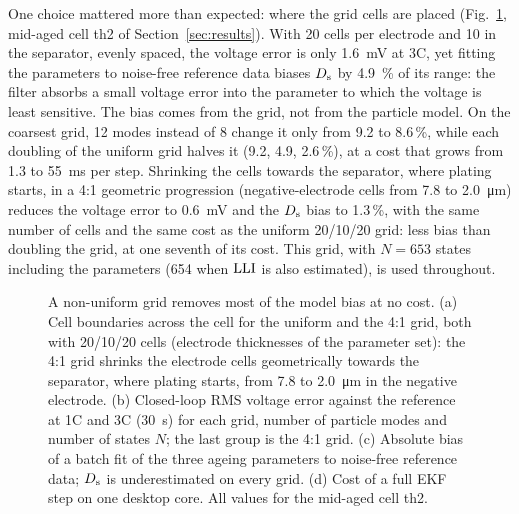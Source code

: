 \documentclass[journal]{IEEEtran}
\begin{document}
One choice mattered more than expected: where the grid cells are placed (Fig.~\ref{fig:grid}, mid-aged cell th2 of Section~\ref{sec:results}). With 20 cells per electrode and 10 in the separator, evenly spaced, the voltage error is only \SI{1.6}{\milli\volt} at 3C, yet fitting the parameters to noise-free reference data biases $D_{\mathrm{s}}$ by \SI{4.9}{\percent} of its range: the filter absorbs a small voltage error into the parameter to which the voltage is least sensitive. The bias comes from the grid, not from the particle model. On the coarsest grid, 12 modes instead of 8 change it only from 9.2 to 8.6\,\%, while each doubling of the uniform grid halves it (9.2, 4.9, 2.6\,\%), at a cost that grows from 1.3 to \SI{55}{\milli\second} per step. Shrinking the cells towards the separator, where plating starts, in a 4:1 geometric progression (negative-electrode cells from 7.8 to \SI{2.0}{\micro\metre}) reduces the voltage error to \SI{0.6}{\milli\volt} and the $D_{\mathrm{s}}$ bias to 1.3\,\%, with the same number of cells and the same cost as the uniform 20/10/20 grid: less bias than doubling the grid, at one seventh of its cost. This grid, with $N=653$ states including the parameters (654 when $\mathrm{LLI}$ is also estimated), is used throughout.
\begin{figure}[t]
\centering

\caption{A non-uniform grid removes most of the model bias at no cost. (a) Cell boundaries across the cell for the uniform and the 4:1 grid, both with 20/10/20 cells (electrode thicknesses of the parameter set\cite{chen2020}): the 4:1 grid shrinks the electrode cells geometrically towards the separator, where plating starts, from 7.8 to \SI{2.0}{\micro\metre} in the negative electrode. (b) Closed-loop RMS voltage error against the reference at 1C and 3C (\SI{30}{\second}) for each grid, number of particle modes and number of states $N$; the last group is the 4:1 grid. (c) Absolute bias of a batch fit of the three ageing parameters to noise-free reference data; $D_{\mathrm{s}}$ is underestimated on every grid. (d) Cost of a full EKF step on one desktop core. All values for the mid-aged cell th2.}
\label{fig:grid}
\end{figure}


\end{document}
